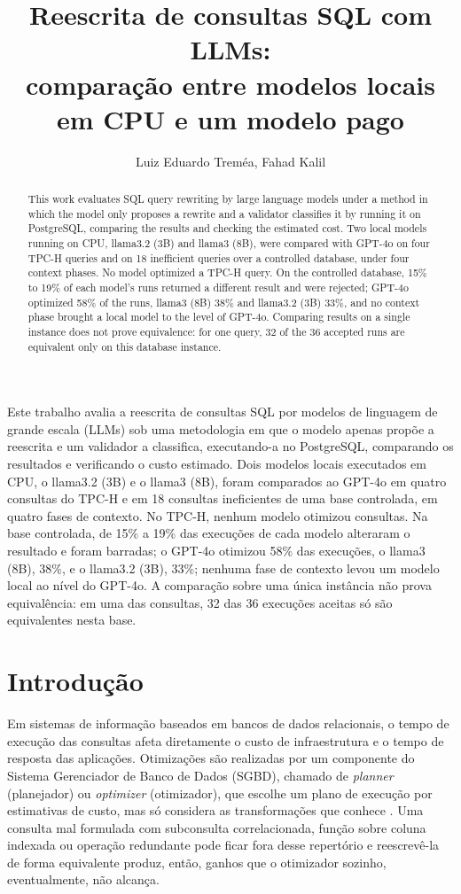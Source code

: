 \documentclass[12pt]{article}
\title{Reescrita de consultas SQL com LLMs: \\comparação entre modelos locais em CPU e um modelo pago} %
\author{Luiz Eduardo Treméa\inst{1}, Fahad Kalil\inst{1}} %
\begin{document}
\maketitle %

\begin{abstract} %
This work evaluates SQL query rewriting by large language models under a method in which the model only proposes a rewrite and a validator classifies it by running it on PostgreSQL, comparing the results and checking the estimated cost. Two local models running on CPU, llama3.2 (3B) and llama3 (8B), were compared with GPT-4o on four TPC-H queries and on 18 inefficient queries over a controlled database, under four context phases. No model optimized a TPC-H query. On the controlled database, 15\% to 19\% of each model's runs returned a different result and were rejected; GPT-4o optimized 58\% of the runs, llama3 (8B) 38\% and llama3.2 (3B) 33\%, and no context phase brought a local model to the level of GPT-4o. Comparing results on a single instance does not prove equivalence: for one query, 32 of the 36 accepted runs are equivalent only on this database instance.
\end{abstract}

\begin{resumo}
Este trabalho avalia a reescrita de consultas SQL por modelos de linguagem de grande escala (LLMs) sob uma metodologia em que o modelo apenas propõe a reescrita e um validador a classifica, executando-a no PostgreSQL, comparando os resultados e verificando o custo estimado. Dois modelos locais executados em CPU, o llama3.2 (3B) e o llama3 (8B), foram comparados ao GPT-4o em quatro consultas do TPC-H e em 18 consultas ineficientes de uma base controlada, em quatro fases de contexto. No TPC-H, nenhum modelo otimizou consultas. Na base controlada, de 15\% a 19\% das execuções de cada modelo alteraram o resultado e foram barradas; o GPT-4o otimizou 58\% das execuções, o llama3 (8B), 38\%, e o llama3.2 (3B), 33\%; nenhuma fase de contexto levou um modelo local ao nível do GPT-4o. A comparação sobre uma única instância não prova equivalência: em uma das consultas, 32 das 36 execuções aceitas só são equivalentes nesta base.
\end{resumo}

\section{Introdução}

Em sistemas de informação baseados em bancos de dados relacionais, o tempo de execução das consultas afeta diretamente o custo de infraestrutura e o tempo de resposta das aplicações. Otimizações são realizadas por um componente do Sistema Gerenciador de Banco de Dados (SGBD), chamado de \textit{planner} (planejador) ou \textit{optimizer} (otimizador), que escolhe um plano de execução por estimativas de custo, mas só considera as transformações que conhece \cite{chaudhuri1998}. Uma consulta mal formulada com subconsulta correlacionada, função sobre coluna indexada ou operação redundante pode ficar fora desse repertório e reescrevê-la de forma equivalente produz, então, ganhos que o otimizador sozinho, eventualmente, não alcança.
\end{document}
